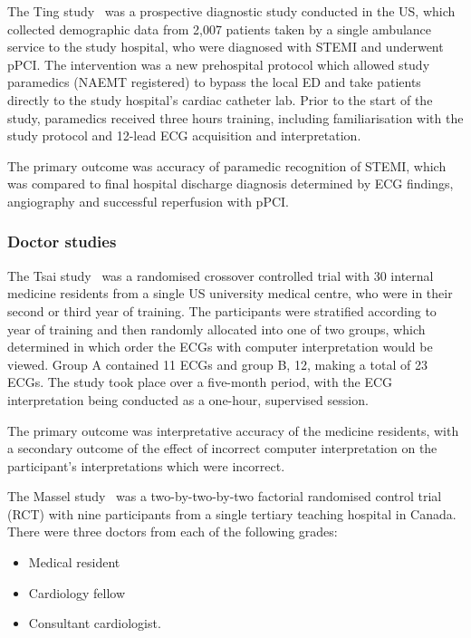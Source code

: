 The Ting study~\citep{ting_abstract_2009} was a prospective diagnostic study conducted in the US, which collected demographic data from 2,007 patients taken by a single ambulance service to the study hospital, who were diagnosed with STEMI and underwent pPCI. The intervention was a new prehospital protocol which allowed study paramedics (NAEMT registered) to bypass the local ED and take patients directly to the study hospital's cardiac catheter lab. Prior to the start of the study, paramedics received three hours training, including familiarisation with the study protocol and 12-lead ECG acquisition and interpretation.

The primary outcome was accuracy of paramedic recognition of STEMI, which was compared to final hospital discharge diagnosis determined by ECG findings, angiography and successful reperfusion with pPCI. 

\subsubsection{Doctor studies}
\label{doctorstudies}

The Tsai study~\citep{tsai_computer_2003} was a randomised crossover controlled trial with 30 internal medicine residents from a single US university medical centre, who were in their second or third year of training. The participants were stratified according to year of training and then randomly allocated into one of two groups, which determined in which order the ECGs with computer interpretation would be viewed. Group A contained 11 ECGs and group B, 12, making a total of 23 ECGs. The study took place over a five-month period, with the ECG interpretation being conducted as a one-hour, supervised session.

The primary outcome was interpretative accuracy of the medicine residents, with a secondary outcome of the effect of incorrect computer interpretation on the participant's interpretations which were incorrect.

The Massel study~\citep{massel_observer_2003} was a two-by-two-by-two factorial randomised control trial (RCT) with nine participants from a single tertiary teaching hospital in Canada. There were three doctors from each of the following grades:

\begin{itemize}
\item Medical resident

\item Cardiology fellow

\item Consultant cardiologist.

\end{itemize}


